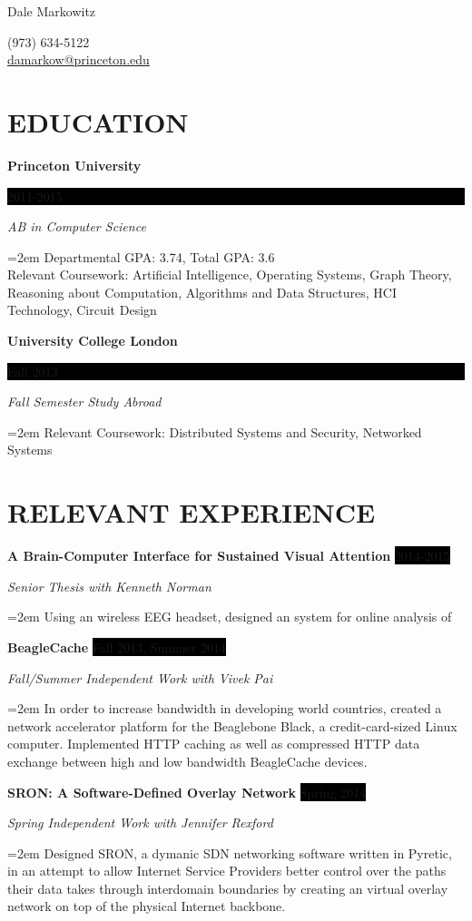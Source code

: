 \documentclass[paper=a4,fontsize=11pt]{scrartcl} %
\newcommand{\sepspace}{\vspace*{1em}}		%
\newcommand{\MyName}[1]{ %
		\Huge \usefont{OT1}{phv}{b}{n} \hfill #1
		\center \par \normalsize \normalfont}
\newcommand{\NewPart}[1]{\section*{\uppercase{#1}}}
\newcommand{\EducationEntry}[4]{
		\noindent \textbf{#1} \hfill      %
		\colorbox{Black}{%
			\parbox{6em}{%
			\hfill\color{White}#2}} \par  %
		\noindent \textit{#3} \par        %
		\noindent\hangindent=2em\hangafter=0 \small #4 %
		\normalsize \par}
\newcommand{\WorkEntry}[4]{				  %
		\noindent \textbf{#1} \hfill      %
		\colorbox{Black}{\color{White}#2} \par  %
		\noindent \textit{#3} \par              %
		\noindent\hangindent=2em\hangafter=0 \small #4 %
		\normalsize \par}
\begin{document}
\begin{center}
\MyName{Dale Markowitz}
(973) 634-5122\\
\url{damarkow@princeton.edu}
\end{center}

\sepspace



\NewPart{Education}{}

\EducationEntry{Princeton University}{2011-2015}{AB in Computer Science}{
	Departmental GPA: 3.74, Total GPA: 3.6\\
	Relevant Coursework: Artificial Intelligence, Operating Systems, Graph Theory, Reasoning about Computation, Algorithms and Data Structures, HCI Technology, Circuit Design
}
\sepspace
\EducationEntry{University College London}{Fall 2013}{Fall Semester Study Abroad}{
	Relevant Coursework:
	Distributed Systems and Security, Networked Systems
}
\sepspace


\NewPart{Relevant Experience}{}


\WorkEntry{A Brain-Computer Interface for Sustained Visual Attention}{2014-2015}{Senior Thesis with Kenneth Norman}{
	 Using an wireless EEG headset, designed an system for online analysis of 
}
\sepspace

\WorkEntry{BeagleCache}{Fall 2013, Summer 2014}{Fall/Summer Independent Work with Vivek Pai}{
	In order to increase bandwidth in developing world countries, created a network accelerator platform for the Beaglebone Black, a credit-card-sized Linux computer.  Implemented HTTP caching as well as compressed HTTP data exchange between high and low bandwidth BeagleCache devices.
}
\sepspace

\WorkEntry{SRON: A Software-Defined Overlay Network}{Spring 2014}{Spring Independent Work with Jennifer Rexford}{
	Designed SRON, a dymanic SDN networking software written in Pyretic, in an attempt to allow Internet Service Providers better control
	over the paths their data takes through interdomain boundaries by creating an virtual overlay network on top of the physical Internet backbone.
}
\sepspace
\end{document}
